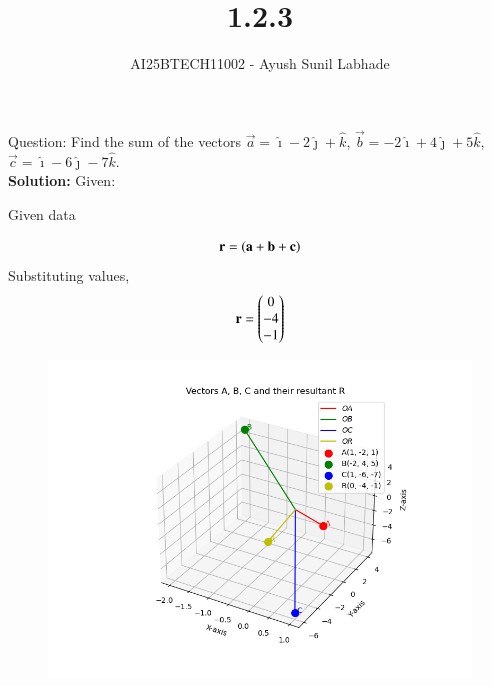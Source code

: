 \documentclass[journal,12pt,onecolumn]{IEEEtran}
\begin{document}
\title{1.2.3}
\author{AI25BTECH11002 - Ayush Sunil Labhade}
{\let\newpage\relax\maketitle}
Question:\newline
Find the sum of the vectors $\vec{a}= \hat{\imath}-2\hat{\jmath}+\hat{k}$, $\vec{b}= -2\hat{\imath}+4\hat{\jmath}+5\hat{k}$, $\vec{c}=\hat{\imath}-6\hat{\jmath}-7\hat{k}$. \\
\textbf{Solution:}
Given:
\begin{table}[H]
	\centering
	
	\label{}
	\caption{Given data}
\end{table}
\begin{align}
	\mathbf{r}=\left(\mathbf{a}+\mathbf{b}+\mathbf{c}\right)
\end{align}
Substituting values,\\
\begin{align}
	\mathbf{r}= \begin{pmatrix}0 \\ -4 \\ -1\end{pmatrix}
\end{align}
\begin{figure}[H]
	\centering
	\includegraphics[scale=0.5]{plot}
	\caption*{}
	\label{fig}
\end{figure}
\end{document}
